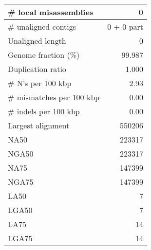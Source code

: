 \documentclass[12pt,a4paper]{article}
\begin{document}
\begin{table}[ht]
\begin{center}
\begin{tabular}{|l*{1}{|r}|}
\# local misassemblies & 0 \\ \hline
\# unaligned contigs & 0 + 0 part \\ \hline
Unaligned length & 0 \\ \hline
Genome fraction (\%) & 99.987 \\ \hline
Duplication ratio & 1.000 \\ \hline
\# N's per 100 kbp & 2.93 \\ \hline
\# mismatches per 100 kbp & 0.00 \\ \hline
\# indels per 100 kbp & 0.00 \\ \hline
Largest alignment & 550206 \\ \hline
NA50 & 223317 \\ \hline
NGA50 & 223317 \\ \hline
NA75 & 147399 \\ \hline
NGA75 & 147399 \\ \hline
LA50 & 7 \\ \hline
LGA50 & 7 \\ \hline
LA75 & 14 \\ \hline
LGA75 & 14 \\ \hline
\end{tabular}
\end{center}
\end{table}
\end{document}
